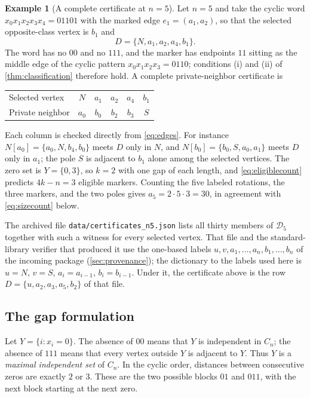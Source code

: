 \documentclass[11pt,letterpaper]{article}
\numberwithin{equation}{section}
\theoremstyle{definition}
\newtheorem{example}[theorem]{Example}
\newcommand{\CM}{\mathcal D}
\newcommand{\1}{\mathbf 1}
\begin{document}
\begin{example}[A complete certificate at $n=5$]\label{ex:n5}
Let $n=5$ and take the cyclic word $x_0x_1x_2x_3x_4=01101$ with the marked
edge $e_1=(a_1,a_2)$, so that the selected opposite-class vertex is $b_1$ and
\[
 D=\{N,a_1,a_2,a_4,b_1\}.
\]
The word has no $00$ and no $111$, and the marker has endpoints $11$ sitting
as the middle edge of the cyclic pattern $x_0x_1x_2x_3=0110$; conditions
(i) and (ii) of \cref{thm:classification} therefore hold. A complete
private-neighbor certificate is
\begin{center}
\begin{tabular}{l@{\qquad}ccccc}
\toprule
Selected vertex & $N$ & $a_1$ & $a_2$ & $a_4$ & $b_1$\\
Private neighbor & $a_0$ & $b_0$ & $b_2$ & $b_3$ & $S$\\
\bottomrule
\end{tabular}
\end{center}
Each column is checked directly from \eqref{eq:edges}. For instance
$N[a_0]=\{a_0,N,b_4,b_0\}$ meets $D$ only in $N$, and
$N[b_0]=\{b_0,S,a_0,a_1\}$ meets $D$ only in $a_1$; the pole $S$ is adjacent
to $b_1$ alone among the selected vertices. The zero set is $Y=\{0,3\}$, so
$k=2$ with one gap of each length, and \eqref{eq:eligiblecount} predicts
$4k-n=3$ eligible markers. Counting the five labeled rotations, the three
markers, and the two poles gives $a_5=2\cdot5\cdot3=30$, in agreement with
\eqref{eq:sizecount} below.
\end{example}

The archived file \texttt{data/certificates\_n5.json} lists all thirty members
of $\CM_5$ together with such a witness for every selected vertex. That file
and the standard-library verifier that produced it use the one-based labels
$u,v,a_1,\dots,a_n,b_1,\dots,b_n$ of the incoming package
(\cref{sec:provenance}); the dictionary to the labels used here is
$u=N$, $v=S$, $a_i=a_{i-1}$, $b_i=b_{i-1}$. Under it, the certificate above
is the row $D=\{u,a_2,a_3,a_5,b_2\}$ of that file.

\subsection{The gap formulation}
Let $Y=\{i:x_i=0\}$. The absence of $00$ means that $Y$ is independent in
$C_n$; the absence of $111$ means that every vertex outside $Y$ is adjacent
to $Y$. Thus $Y$ is a \emph{maximal independent set} of $C_n$. In the cyclic
order, distances between consecutive zeros are exactly $2$ or $3$.
These are the two possible blocks $01$ and $011$, with the next block starting
at the next zero.
\end{document}
